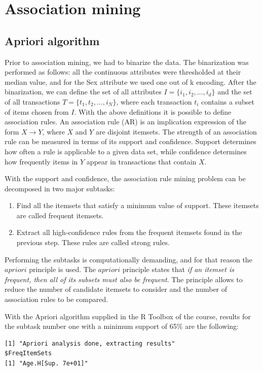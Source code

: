 \documentclass[10pt, paper=a4]{article}
\begin{document}
\section{Association mining}
\label{sec:association}
\subsection{Apriori algorithm}
Prior to association mining, we had to binarize the data.  The binarization was
performed as follows: all the continuous attributes were thresholded at their
median value, and for the Sex attribute we used one out of k encoding.  After
the binarization, we can define the set of all attributes $I = \{i_1, i_2,\dots
,i_d\}$ and the set of all transactions $T = \{t_1, t_2, \dots ,i_N\}$, where
each transaction $t_i$ contains a subset of items chosen from $I$.  With the
above definitions it is possible to define association rules.  An association
rule (AR) is an implication expression of the form $X \rightarrow Y$, where $X$
and $Y$ are disjoint itemsets.  The strength of an association rule can be
measured in terms of its support and confidence.  Support determines how often a
rule is applicable to a given data set, while confidence determines how
frequently items in $Y$ appear in transactions that contain $X$.

With the support and confidence, the association rule mining problem can be
decomposed in two major subtasks:
\begin{enumerate}
\item Find all the itemsets that satisfy a minimum value of support. These
  itemsets are called frequent itemsets.
\item Extract all high-confidence rules from the frequent itemsets found in the
  previous step. These rules are called strong rules.
\end{enumerate}

Performing the subtasks is computationally demanding, and for that reason the
$apriori$ principle is used.  The $apriori$ principle states that \textit{if an
  itemset is frequent, then all of its subsets must also be frequent}.  The
principle allows to reduce the number of candidate itemsets to consider and the
number of association rules to be compared.

With the Apriori algorithm supplied in the R Toolbox of the course, results for
the subtask number one with a minimum support of 65\% are the following:
\begin{verbatim}
[1] "Apriori analysis done, extracting results"
$FreqItemSets
[1] "Age.H[Sup. 7e+01]"
\end{verbatim}
\end{document}

